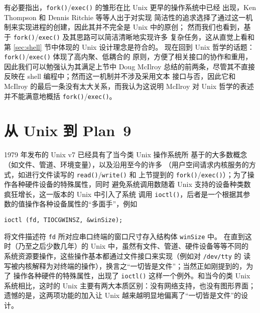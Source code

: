 有必要指出，\verb|fork()|/\verb|exec()| 的雏形在比 Unix 更早的操作系统中已经
出现，Ken Thompson 和 Dennis Ritchie 等等人出于对实现
简洁性的追求选择了通过这一机制来实现进程的创建，因此其并不完全是 Unix 中的原创；
然而我们也看到，基于 \verb|fork()|/\verb|exec()| 及其思路可以简洁清晰地实现许多
复杂任务，这从直觉上看和第 \ref{sec:shell} 节中体现的 Unix 设计理念是符合的。
现在回到 Unix 哲学的话题：\verb|fork()|/\verb|exec()| 体现了高内聚、低耦合的
原则，方便了相关接口的协作和重用，因此我们可以勉强认为其满足上节中 Doug McIlroy
总结的前两条，尽管其不直接反映在 shell 编程中；然而这一机制并不涉及采用文本
接口与否，因此它和 McIlroy 的最后一条没有太大关系，而我认为这说明 McIlroy
对 Unix 哲学的表述并不能满意地概括 \verb|fork()|/\verb|exec()|。

\section{从 Unix 到 Plan~9}\label{sec:plan9}

1979 年发布的 Unix v7 已经具有了当今类 Unix 操作系统所
基于的大多数概念（如文件、管道、环境变量），以及沿用至今的许多%
（用户空间请求内核服务的方式，如进行文件读写的 \verb|read()|/\verb|write()| 和
上节提到的 \verb|fork()|/\verb|exec()|）；为了操作各种硬件设备的特殊属性，同时
避免系统调用数随着 Unix 支持的设备种类数疯狂增长，这一版本的 Unix 中引入了系统
调用 \verb|ioctl()|，后者是一个根据其参数的值操作各种设备属性的“多面手”，例如
\begin{wquoting}
\begin{Verbatim}
ioctl (fd, TIOCGWINSZ, &winSize);
\end{Verbatim}
\end{wquoting}
将文件描述符 \verb|fd| 所对应串口终端的窗口尺寸存入结构体 \verb|winSize| 中。
在直到这时（乃至之后少数几年）的 Unix 中，虽然有文件、管道、硬件设备等等不同的
系统资源要操作，这些操作基本都通过文件接口来实现（例如对 \verb|/dev/tty| 的
读写被内核解释为对终端的操作），换言之“一切皆是文件”；当然正如刚提到的，为了
操作各种硬件的特殊属性，出现了 \verb|ioctl()| 这样一个例外。和当今的类 Unix
系统相比，这时的 Unix 主要有两大本质区别：没有网络支持，也没有图形界面；
遗憾的是，这两项功能的加入让 Unix 越来越明显地偏离了“一切皆是文件”的设计。

